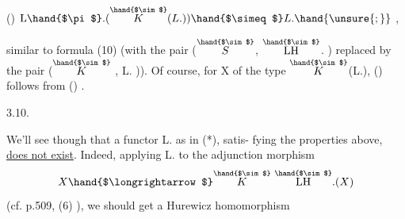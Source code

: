 () \qquad $\mathrm{L}\hand{$\pi$}.(\overset{\hand{$\sim$}}{K}(L.)) \hand{$\simeq$} L.\hand{\unsure{;}}$ \quad {} ,

similar to formula (10)  (with the pair  ($\overset{\hand{$\sim$}}{S}$, $\overset{\hand{$\sim$}}{\mathrm{LH}}$. )  replaced by the pair
($\overset{\hand{$\sim$}}{K}$ , L\hand{$\pi$}. )).  Of course,  for X of the type $\overset{\hand{$\sim$}}{K}$(L.),  () follows from
() .

3.10.

 We'll see though that a functor  L\hand{$\pi$}.  \xout{(*)} as in (*),  satis-%
fying the properties above,  \uline{does not exist}.  Indeed,  applying L\hand{$\pi$}. to
the adjunction morphism
\[ X \hand{$\longrightarrow$} \overset{\hand{$\sim$}}{K}\ \overset{\hand{$\sim$}}{\mathrm{LH}}.(X) \]
(cf. p.509, (6) ), we should get a Hurewicz  homomorphism


